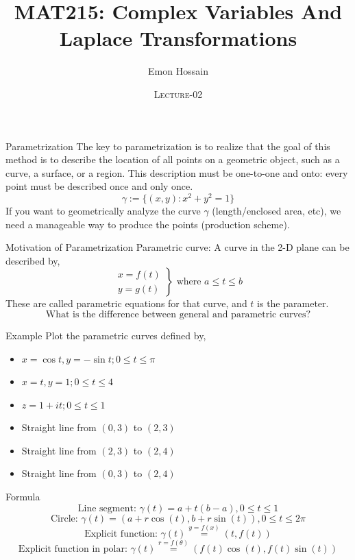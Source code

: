 \documentclass[11pt]{beamer}
\author[] %
{Emon Hossain\inst{1}}
\institute[University of Dhaka] %
{
  \inst{1}%
  Lecturer\\MNS department\\Brac University
}
\date[] %
{\textsc{Lecture-02}}
\title[]{MAT215: Complex Variables And Laplace Transformations}
\theoremstyle{plain}
\begin{document}
\begin{frame}
\titlepage
\end{frame}

\begin{frame}{Parametrization}
    The key to parametrization is to realize that the goal of this method is to describe the location of all points on a geometric object, such as a curve, a surface, or a region. This description must be one-to-one and onto: every point must be described once and only once.
    $$\gamma:=\{(x,y): x^2+y^2=1\}$$
If you want to geometrically analyze the curve $\gamma$ (length/enclosed area, etc), we need a manageable way to produce the points (production scheme). 
\end{frame}

\begin{frame}{Motivation of Parametrization}
    Parametric curve: A curve in the 2-D plane can be described by,
$$
\left.\begin{array}{l}
x=f(t) \\
y=g(t)
\end{array}\right\} \text { where } a \leqslant t \leqslant b
$$
These are called parametric equations for that curve, and $t$ is the parameter. 
$$\boxed{\text{What is the difference between general and parametric curves?}}$$
\end{frame}

\begin{frame}{Example}
Plot the parametric curves defined by,
\begin{itemize}
    \item $x=\cos t, y=-\sin t ; 0 \leq t \leq \pi$
    \item $x=t, y=1 ; 0 \leq t \leq 4$
    \item $z=1+i t ; 0 \leq t \leq 1$ 
    \item Straight line from $(0,3)$ to $(2,3)$
    \item Straight line from $(2,3)$ to $(2,4)$
    \item Straight line from $(0,3)$ to $(2,4)$
\end{itemize}
\end{frame}

\begin{frame}{Formula}
    $$\boxed{\text{Line segment: }\gamma(t)= a+t(b-a), 0\leq t\leq 1}$$
    $$\boxed{\text{Circle: }\gamma(t)=(a+r\cos(t),b+r\sin(t)) , 0\leq t\leq 2\pi}$$
    $$\boxed{\text{Explicit function: }\gamma(t)\stackrel{y=f(x)}{=}(t,f(t))}$$
    $$\boxed{\text{Explicit function in polar: }\gamma(t)\stackrel{r=f(\theta)}{=}(f(t)\cos(t),f(t)\sin(t))}$$
\end{frame}
\end{document}

